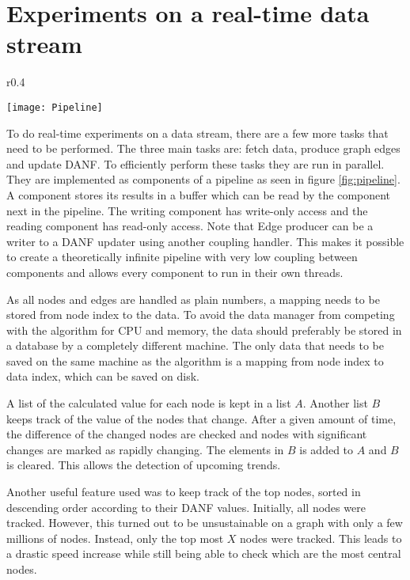 \section{Experiments on a real-time data stream}

\begin{wrapfigure}{r}{0.4\textwidth}
  \begin{center}
    \texttt{[image: Pipeline]}
  \end{center}
  \caption{Parallel-compatible pipeline layout}
  \label{fig:pipeline}
\end{wrapfigure}

To do real-time experiments on a data stream, there are a few more tasks that need to be performed. The three main tasks are: fetch data, produce graph edges and update DANF. To efficiently perform these tasks they are run in parallel. They are implemented as components of a pipeline as seen in figure \ref{fig:pipeline}. A component stores its results in a buffer which can be read by the component next in the pipeline. The writing component has write-only access and the reading component has read-only access. Note that Edge producer can be a writer to a DANF updater using another coupling handler. This makes it possible to create a theoretically infinite pipeline with very low coupling between components and allows every component to run in their own threads.

As all nodes and edges are handled as plain numbers, a mapping needs to be stored from node index to the data. To avoid the data manager from competing with the algorithm for CPU and memory, the data should preferably be stored in a database by a completely different machine. The only data that needs to be saved on the same machine as the algorithm is a mapping from node index to data index, which can be saved on disk.

A list of the calculated value for each node is kept in a list $A$. Another list $B$ keeps track of the value of the nodes that change. After a given amount of time, the difference of the changed nodes are checked and nodes with significant changes are marked as rapidly changing. The elements in $B$ is added to $A$ and $B$ is cleared. This allows the detection of upcoming trends. 

Another useful feature used was to keep track of the top nodes, sorted in descending order according to their DANF values. Initially, all nodes were tracked. However, this turned out to be unsustainable on a graph with only a few millions of nodes. Instead, only the top most $X$ nodes were tracked. This leads to a drastic speed increase while still being able to check which are the most central nodes. 


